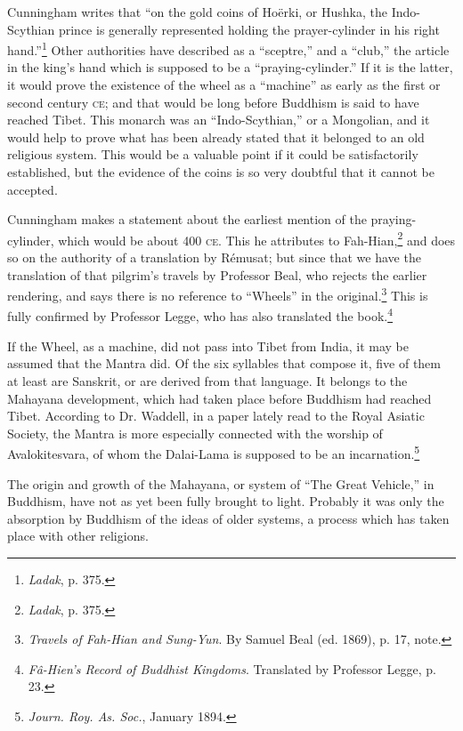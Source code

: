 \documentclass[a4paper, 11pt, oneside, polutonikogreek, english]{article}
\begin{document}
Cunningham writes that ``on the gold coins of Hoërki, or Hushka, the Indo-Scythian prince is generally represented holding the prayer-cylinder in his right hand.''\footnote{\emph{Ladak}, p. 375.} Other authorities have described as a ``sceptre,'' and a ``club,'' the article in the king's hand which is supposed to be a ``praying-cylinder.'' If it is the latter, it would prove the existence of the wheel as a ``machine'' as early as the first or second century \textsc{ce}; and that would be long before Buddhism is said to have reached Tibet. This monarch was an ``Indo-Scythian,'' or a Mongolian, and it would help to prove what has been already stated that it belonged to an old religious system. This would be a valuable point if it could be satisfactorily established, but the evidence of the coins is so very doubtful that it cannot be accepted.

Cunningham makes a statement about the earliest mention of the praying-cylinder, which would be about 400 \textsc{ce}. This he attributes to Fah-Hian,\footnote{\emph{Ladak}, p. 375.} and does so on the authority of a translation by Rémusat; but since that we have the translation of that pilgrim's travels by Professor Beal, who rejects the earlier rendering, and says there is no reference to ``Wheels'' in the original.\footnote{\emph{Travels of Fah-Hian and Sung-Yun}. By Samuel Beal (ed. 1869), p. 17, note.} This is fully confirmed by Professor Legge, who has also translated the book.\footnote{\emph{Fâ-Hien's Record of Buddhist Kingdoms}. Translated by Professor Legge, p. 23.}

If the Wheel, as a machine, did not pass into Tibet from India, it may be assumed that the Mantra did. Of the six syllables that compose it, five of them at least are Sanskrit, or are derived from that language. It belongs to the Mahayana development, which had taken place before Buddhism had reached Tibet. According to Dr. Waddell, in a paper lately read to the Royal Asiatic Society, the Mantra is more especially connected with the worship of Avalokitesvara, of whom the Dalai-Lama is supposed to be an incarnation.\footnote{\emph{Journ. Roy. As. Soc.}, January 1894.}

The origin and growth of the Mahayana, or system of ``The Great Vehicle,'' in Buddhism, have not as yet been fully brought to light. Probably it was only the absorption by Buddhism of the ideas of older systems, a process which has taken place with other religions.
\end{document}

